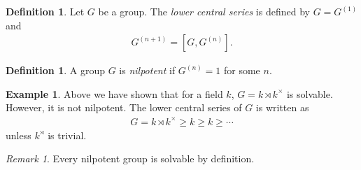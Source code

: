 \documentclass[12pt]{report}
\theoremstyle{plain}
\theoremstyle{remark}
\newtheorem*{remark}{Remark}
\theoremstyle{definition}
\newtheorem{definition}[theorem]{Definition}
\newtheorem{example}[theorem]{Example}
\begin{document}
\begin{definition}
    Let $G$ be a group. The \emph{lower central series} is defined by $G=G^{(1)}$ and
    \begin{align*}
        G^{(n+1)}=[G,G^{(n)}].
    \end{align*}
\end{definition}

\begin{definition}
    A group $G$ is \emph{nilpotent} if $G^{(n)}=1$ for some $n$.
\end{definition}

\begin{example}
    Above we have shown that for a field $k$, $G=k\rtimes k^\times$ is solvable. However, it is not nilpotent. The lower central series of $G$ is written as
    \begin{align*}
        G=k\rtimes k^\times \ge k \ge k \ge \cdots
    \end{align*}
    unless $k^\rtimes$ is trivial.
\end{example}
\begin{remark}
    Every nilpotent group is solvable by definition.
\end{remark}
\end{document}
